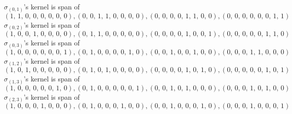 \documentclass[8pt]{article}\usepackage{amsmath}
\begin{document}
\( \sigma_{(0, 1)}\)'s kernel is span of   
\[ \left(1,\,1,\,0,\,0,\,0,\,0,\,0,\,0\right) , \left(0,\,0,\,1,\,1,\,0,\,0,\,0,\,0\right) , \left(0,\,0,\,0,\,0,\,1,\,1,\,0,\,0\right) , \left(0,\,0,\,0,\,0,\,0,\,0,\,1,\,1\right) \]\( \sigma_{(0, 2)}\)'s kernel is span of   
\[ \left(1,\,0,\,0,\,1,\,0,\,0,\,0,\,0\right) , \left(0,\,1,\,1,\,0,\,0,\,0,\,0,\,0\right) , \left(0,\,0,\,0,\,0,\,1,\,0,\,0,\,1\right) , \left(0,\,0,\,0,\,0,\,0,\,1,\,1,\,0\right) \]\( \sigma_{(0, 3)}\)'s kernel is span of   
\[ \left(1,\,0,\,0,\,0,\,0,\,0,\,0,\,1\right) , \left(0,\,1,\,0,\,0,\,0,\,0,\,1,\,0\right) , \left(0,\,0,\,1,\,0,\,0,\,1,\,0,\,0\right) , \left(0,\,0,\,0,\,1,\,1,\,0,\,0,\,0\right) \]\( \sigma_{(1, 2)}\)'s kernel is span of   
\[ \left(1,\,0,\,1,\,0,\,0,\,0,\,0,\,0\right) , \left(0,\,1,\,0,\,1,\,0,\,0,\,0,\,0\right) , \left(0,\,0,\,0,\,0,\,1,\,0,\,1,\,0\right) , \left(0,\,0,\,0,\,0,\,0,\,1,\,0,\,1\right) \]\( \sigma_{(1, 3)}\)'s kernel is span of   
\[ \left(1,\,0,\,0,\,0,\,0,\,0,\,1,\,0\right) , \left(0,\,1,\,0,\,0,\,0,\,0,\,0,\,1\right) , \left(0,\,0,\,1,\,0,\,1,\,0,\,0,\,0\right) , \left(0,\,0,\,0,\,1,\,0,\,1,\,0,\,0\right) \]\( \sigma_{(2, 3)}\)'s kernel is span of   
\[ \left(1,\,0,\,0,\,0,\,1,\,0,\,0,\,0\right) , \left(0,\,1,\,0,\,0,\,0,\,1,\,0,\,0\right) , \left(0,\,0,\,1,\,0,\,0,\,0,\,1,\,0\right) , \left(0,\,0,\,0,\,1,\,0,\,0,\,0,\,1\right) \]
\end{document}
